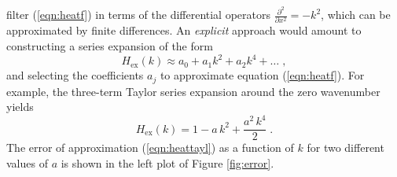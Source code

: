 filter (\ref{eqn:heatf}) in terms of the differential operators
$\frac{\partial^2}{\partial x^2} = - k^2$, which can be approximated
by finite differences. An \emph{explicit} approach would amount to
constructing a series expansion of the form
\begin{equation}
  \label{eqn:heatexpl}
  H_{\mbox{ex}} (k) \approx a_0 + a_1 k^2 + a_2 k^4 + \ldots\;,
\end{equation}
and selecting the coefficients $a_j$ to approximate equation
(\ref{eqn:heatf}). For example, the three-term Taylor series expansion
around the zero wavenumber yields
\begin{equation}
  \label{eqn:heattayl}
  H_{\mbox{ex}} (k) = 1 - a\,{k^2}  +
  {\frac{{{a }^2}\,{k^4}}{2}} \;.
\end{equation}
The error of approximation (\ref{eqn:heattayl}) as a function of $k$
for two different values of $a$ is shown in the left plot of Figure
\ref{fig:error}.


